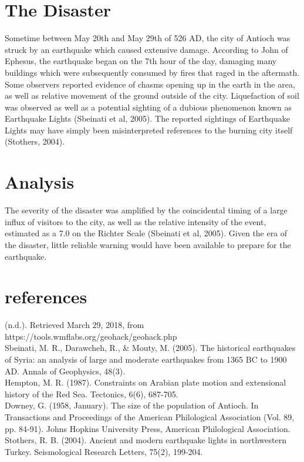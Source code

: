 \documentclass{article}
\begin{document}
\section{The Disaster}
 Sometime between May 20th and May 29th of 526 AD, the city of Antioch was struck
 by an earthquake which caused extensive damage. According to John of Ephesus,
 the earthquake began on the 7th hour of the day, damaging many buildings which
 were subsequently consumed by fires that raged in the aftermath. Some observers
 reported evidence of chasms opening up in the earth in the area, as well as
 relative movement of the ground outside of the city. Liquefaction of soil was
 observed as well as a potential sighting of a dubious phenomenon known as
 Earthquake Lights (Sbeinati et al, 2005). The reported sightings of Earthquake
 Lights may have simply been misinterpreted references to the burning city itself (Stothers, 2004).

\section{Analysis}
 The severity of the disaster was amplified by the coincidental timing of a large
 influx of visitors to the city, as well as the relative intensity of the event,
 estimated as a 7.0 on the Richter Scale (Sbeinati et al, 2005). Given the era
 of the disaster, little reliable warning would have been available to prepare
 for the earthquake.

\newpage
\section{references}
(n.d.). Retrieved March 29, 2018, from https://tools.wmflabs.org/geohack/geohack.php\\
Sbeinati, M. R., Darawcheh, R., \& Mouty, M. (2005). The historical earthquakes of Syria: an analysis of large and moderate earthquakes from 1365 BC to 1900 AD. Annals of Geophysics, 48(3).\\
Hempton, M. R. (1987). Constraints on Arabian plate motion and extensional history of the Red Sea. Tectonics, 6(6), 687-705.\\
Downey, G. (1958, January). The size of the population of Antioch. In Transactions and Proceedings of the American Philological Association (Vol. 89, pp. 84-91). Johns Hopkins University Press, American Philological Association.\\
Stothers, R. B. (2004). Ancient and modern earthquake lights in northwestern Turkey. Seismological Research Letters, 75(2), 199-204.\\	
\end{document}
